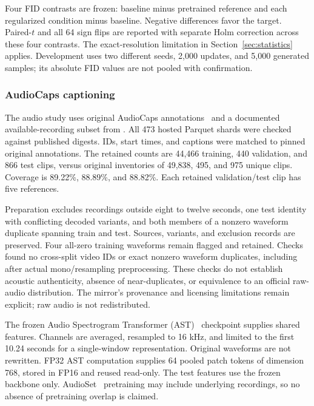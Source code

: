 \documentclass[a4paper,fleqn]{cas-dc}
\begin{document}
Four FID contrasts are frozen: baseline minus pretrained
reference and each regularized condition minus baseline.
Negative differences favor the target.
Paired-$t$ and all 64 sign flips are reported with separate
Holm correction across these four contrasts.
The exact-resolution limitation in
Section~\ref{sec:statistics} applies.
Development uses two different seeds, 2,000 updates,
and 5,000 generated samples; its absolute FID values are
not pooled with confirmation.

\subsubsection{AudioCaps captioning}
\label{sec:audio_setup}

The audio study uses original AudioCaps
annotations~\cite{kim2019audiocaps} and a documented
available-recording subset from
.
All 473 hosted Parquet shards were checked against published
digests. IDs, start times, and captions were matched to pinned
original annotations.
The retained counts are 44,466 training, 440 validation,
and 866 test clips, versus original inventories of
49,838, 495, and 975 unique clips.
Coverage is 89.22\%, 88.89\%, and 88.82\%.
Each retained validation/test clip has five references.

Preparation excludes recordings outside eight to twelve seconds,
one test identity with conflicting decoded variants,
and both members of a nonzero waveform duplicate spanning train
and test. Sources, variants, and exclusion records are preserved.
Four all-zero training waveforms remain flagged and retained.
Checks found no cross-split video IDs or exact nonzero waveform
duplicates, including after actual mono/resampling preprocessing.
These checks do not establish acoustic authenticity, absence
of near-duplicates, or equivalence to an official raw-audio
distribution. The mirror's provenance and licensing limitations
remain explicit; raw audio is not redistributed.

The frozen Audio Spectrogram Transformer
(AST)~\cite{gong2021ast} checkpoint
supplies shared features.
Channels are averaged, resampled to 16 kHz, and limited to the
first 10.24 seconds for a single-window representation.
Original waveforms are not rewritten.
FP32 AST computation supplies 64 pooled patch tokens of
dimension 768, stored in FP16 and reused read-only.
The test features use the frozen backbone only.
AudioSet~\cite{gemmeke2017audioset} pretraining may include
underlying recordings, so no absence of pretraining overlap
is claimed.
\end{document}
